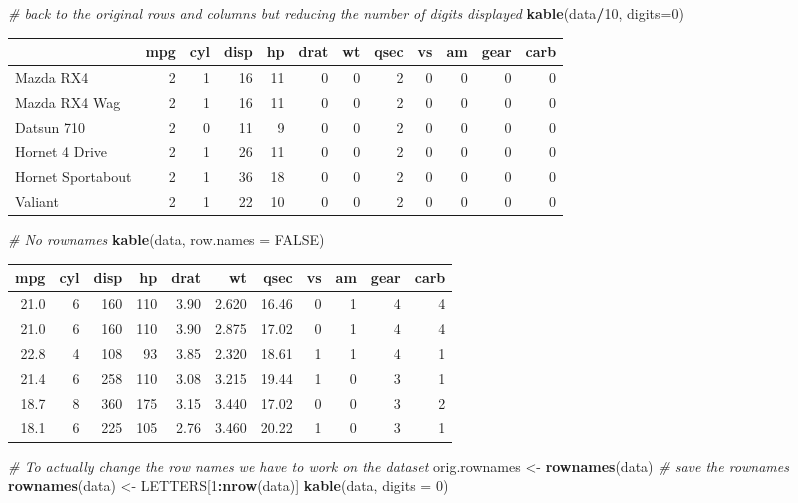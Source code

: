 \documentclass[]{article}
\newenvironment{Shaded}{\begin{snugshade}}{\end{snugshade}}
\newcommand{\KeywordTok}[1]{\textcolor[rgb]{0.13,0.29,0.53}{\textbf{#1}}}
\newcommand{\DataTypeTok}[1]{\textcolor[rgb]{0.13,0.29,0.53}{#1}}
\newcommand{\DecValTok}[1]{\textcolor[rgb]{0.00,0.00,0.81}{#1}}
\newcommand{\StringTok}[1]{\textcolor[rgb]{0.31,0.60,0.02}{#1}}
\newcommand{\CommentTok}[1]{\textcolor[rgb]{0.56,0.35,0.01}{\textit{#1}}}
\newcommand{\OtherTok}[1]{\textcolor[rgb]{0.56,0.35,0.01}{#1}}
\newcommand{\OperatorTok}[1]{\textcolor[rgb]{0.81,0.36,0.00}{\textbf{#1}}}
\newcommand{\NormalTok}[1]{#1}
\begin{document}
\begin{Shaded}
\begin{Highlighting}[]
\CommentTok{# back to the original rows and columns but reducing the number of digits displayed}
\KeywordTok{kable}\NormalTok{(data}\OperatorTok{/}\DecValTok{10}\NormalTok{, }\DataTypeTok{digits=}\DecValTok{0}\NormalTok{)}
\end{Highlighting}
\end{Shaded}

\begin{longtable}[]{@{}lrrrrrrrrrrr@{}}
\toprule
& mpg & cyl & disp & hp & drat & wt & qsec & vs & am & gear &
carb\tabularnewline
\midrule
\endhead
Mazda RX4 & 2 & 1 & 16 & 11 & 0 & 0 & 2 & 0 & 0 & 0 & 0\tabularnewline
Mazda RX4 Wag & 2 & 1 & 16 & 11 & 0 & 0 & 2 & 0 & 0 & 0 &
0\tabularnewline
Datsun 710 & 2 & 0 & 11 & 9 & 0 & 0 & 2 & 0 & 0 & 0 & 0\tabularnewline
Hornet 4 Drive & 2 & 1 & 26 & 11 & 0 & 0 & 2 & 0 & 0 & 0 &
0\tabularnewline
Hornet Sportabout & 2 & 1 & 36 & 18 & 0 & 0 & 2 & 0 & 0 & 0 &
0\tabularnewline
Valiant & 2 & 1 & 22 & 10 & 0 & 0 & 2 & 0 & 0 & 0 & 0\tabularnewline
\bottomrule
\end{longtable}

\begin{Shaded}
\begin{Highlighting}[]
\CommentTok{# No rownames}
\KeywordTok{kable}\NormalTok{(data, }\DataTypeTok{row.names =} \OtherTok{FALSE}\NormalTok{)}
\end{Highlighting}
\end{Shaded}

\begin{longtable}[]{@{}rrrrrrrrrrr@{}}
\toprule
mpg & cyl & disp & hp & drat & wt & qsec & vs & am & gear &
carb\tabularnewline
\midrule
\endhead
21.0 & 6 & 160 & 110 & 3.90 & 2.620 & 16.46 & 0 & 1 & 4 &
4\tabularnewline
21.0 & 6 & 160 & 110 & 3.90 & 2.875 & 17.02 & 0 & 1 & 4 &
4\tabularnewline
22.8 & 4 & 108 & 93 & 3.85 & 2.320 & 18.61 & 1 & 1 & 4 &
1\tabularnewline
21.4 & 6 & 258 & 110 & 3.08 & 3.215 & 19.44 & 1 & 0 & 3 &
1\tabularnewline
18.7 & 8 & 360 & 175 & 3.15 & 3.440 & 17.02 & 0 & 0 & 3 &
2\tabularnewline
18.1 & 6 & 225 & 105 & 2.76 & 3.460 & 20.22 & 1 & 0 & 3 &
1\tabularnewline
\bottomrule
\end{longtable}

\begin{Shaded}
\begin{Highlighting}[]
\CommentTok{# To actually change the row names we have to work on the dataset}
\NormalTok{orig.rownames <-}\StringTok{ }\KeywordTok{rownames}\NormalTok{(data)  }\CommentTok{# save the rownames}
\KeywordTok{rownames}\NormalTok{(data) <-}\StringTok{ }\NormalTok{LETTERS[}\DecValTok{1}\OperatorTok{:}\KeywordTok{nrow}\NormalTok{(data)]}
\KeywordTok{kable}\NormalTok{(data, }\DataTypeTok{digits =} \DecValTok{0}\NormalTok{)}
\end{Highlighting}
\end{Shaded}
\end{document}
